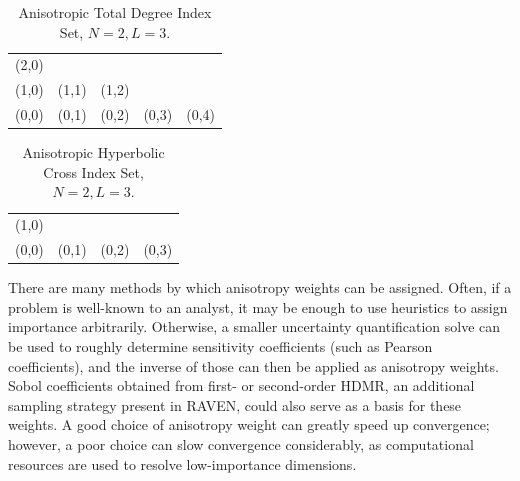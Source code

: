 \begin{table}[h]
  \centering
  \begin{tabular}{c c c c c}
    (2,0) &       &       &       & \\
    (1,0) & (1,1) & (1,2) &       & \\
    (0,0) & (0,1) & (0,2) & (0,3) & (0,4)
  \end{tabular}
  \caption{Anisotropic Total Degree Index Set, $N=2,L=3$.}
  \label{tab:aniTD}
\end{table}

\begin{table}[h]
  \centering
  \begin{tabular}{c c c c}
    (1,0) &       &       &       \\
    (0,0) & (0,1) & (0,2) & (0,3)
  \end{tabular}
  \caption{Anisotropic Hyperbolic Cross Index Set, $N=2,L=3$.}
  \label{tab:aniHC}
\end{table}

There are many methods by which anisotropy weights can be assigned.  Often, if a problem is well-known to an
analyst, it may be enough to use heuristics to assign importance arbitrarily.  Otherwise, a smaller
uncertainty quantification solve can be used to roughly determine sensitivity coefficients (such as Pearson
coefficients), and the inverse of those can then be applied as anisotropy weights.  Sobol coefficients
obtained from first- or second-order HDMR, an additional sampling strategy present in RAVEN, could also serve as a basis for these weights.
A good choice of anisotropy weight can greatly speed up convergence; however, a
poor choice can slow convergence considerably, as computational resources are used to resolve low-importance
dimensions.

